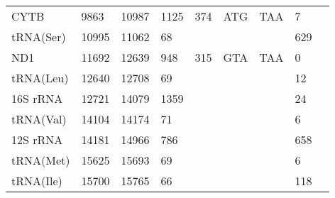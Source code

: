 \documentclass[../DISSERTACAO_MAIN.tex]{subfiles}
\begin{document}
\begin{longtable}{llllllllllllllllllllll}
			CYTB         & \multicolumn{2}{l}{9863}    & \multicolumn{2}{l}{10987}   & \multicolumn{2}{l}{1125}        & \multicolumn{3}{l}{374}                       & \multicolumn{3}{l}{ATG}   & \multicolumn{3}{l}{TAA}     & \multicolumn{3}{l}{7}           & \multicolumn{3}{l}{}         \\
			tRNA(Ser)    & \multicolumn{2}{l}{10995}   & \multicolumn{2}{l}{11062}   & \multicolumn{2}{l}{68}          & \multicolumn{3}{l}{}                          & \multicolumn{3}{l}{}      & \multicolumn{3}{l}{}        & \multicolumn{3}{l}{629}         & \multicolumn{3}{l}{}         \\
			ND1          & \multicolumn{2}{l}{11692}   & \multicolumn{2}{l}{12639}   & \multicolumn{2}{l}{948}         & \multicolumn{3}{l}{315}                       & \multicolumn{3}{l}{GTA}   & \multicolumn{3}{l}{TAA}     & \multicolumn{3}{l}{0}           & \multicolumn{3}{l}{}         \\
			tRNA(Leu)    & \multicolumn{2}{l}{12640}   & \multicolumn{2}{l}{12708}   & \multicolumn{2}{l}{69}          & \multicolumn{3}{l}{}                          & \multicolumn{3}{l}{}      & \multicolumn{3}{l}{}        & \multicolumn{3}{l}{12}          & \multicolumn{3}{l}{}         \\
			16S 				rRNA & \multicolumn{2}{l}{12721}   & \multicolumn{2}{l}{14079}   & \multicolumn{2}{l}{1359}        & \multicolumn{3}{l}{}                          & \multicolumn{3}{l}{}      & \multicolumn{3}{l}{}        & \multicolumn{3}{l}{24}          & \multicolumn{3}{l}{}         \\
			tRNA(Val)    & \multicolumn{2}{l}{14104}   & \multicolumn{2}{l}{14174}   & \multicolumn{2}{l}{71}          & \multicolumn{3}{l}{}                          & \multicolumn{3}{l}{}      & \multicolumn{3}{l}{}        & \multicolumn{3}{l}{6}           & \multicolumn{3}{l}{}         \\
			12S 				rRNA & \multicolumn{2}{l}{14181}   & \multicolumn{2}{l}{14966}   & \multicolumn{2}{l}{786}         & \multicolumn{3}{l}{}                          & \multicolumn{3}{l}{}      & \multicolumn{3}{l}{}        & \multicolumn{3}{l}{658}         & \multicolumn{3}{l}{}         \\
			tRNA(Met)    & \multicolumn{2}{l}{15625}   & \multicolumn{2}{l}{15693}   & \multicolumn{2}{l}{69}          & \multicolumn{3}{l}{}                          & \multicolumn{3}{l}{}      & \multicolumn{3}{l}{}        & \multicolumn{3}{l}{6}           & \multicolumn{3}{l}{}         \\
			tRNA(Ile)    & \multicolumn{2}{l}{15700}   & \multicolumn{2}{l}{15765}   & \multicolumn{2}{l}{66}          & \multicolumn{3}{l}{}                          & \multicolumn{3}{l}{}      & \multicolumn{3}{l}{}        & \multicolumn{3}{l}{118}         & \multicolumn{3}{l}{}         \\

\end{longtable}
\end{document}
